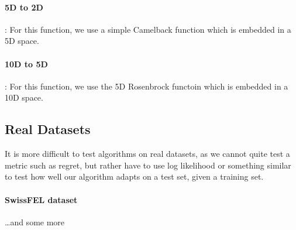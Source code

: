 \paragraph{5D to 2D}: For this function, we use a simple Camelback function which is embedded in a 5D space.
\paragraph{10D to 5D}: For this function, we use the 5D Rosenbrock functoin which is embedded in a 10D space.

\subsection{Real Datasets}
It is more difficult to test algorithms on real datasets, as we cannot quite test a metric such as regret, but rather have to use log likelihood or something similar to test how well our algorithm adapts on a test set, given a training set.

\paragraph{SwissFEL dataset}
\dots and some more 


